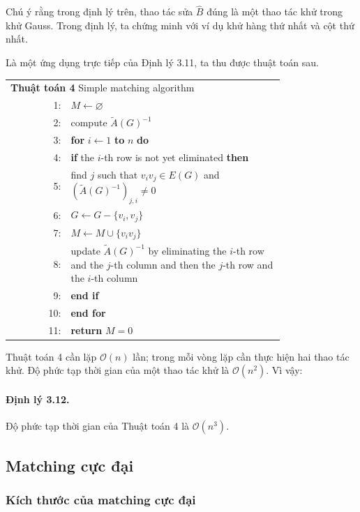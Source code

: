 \documentclass[11pt]{article}
\newcommand{\Oh}{\mathcal{O}}
\begin{document}
Chú ý rằng trong định lý trên, thao tác sửa \(\hat B\) đúng là một thao tác
khử trong khử Gauss. Trong định lý, ta chứng minh với ví dụ khử hàng thứ nhất
và cột thứ nhất.

Là một ứng dụng trực tiếp của Định lý 3.11, ta thu được thuật toán sau.

\begin{center}
\small
\begin{tabular}{r@{\quad}p{0.78\linewidth}}
\multicolumn{2}{l}{\textbf{Thuật toán 4} Simple matching algorithm}\\
1: & \(M\gets\varnothing\)\\
2: & compute \(\tilde A(G)^{-1}\)\\
3: & \textbf{for} \(i\gets 1\) \textbf{to} \(n\) \textbf{do}\\
4: & \quad \textbf{if} the \(i\)-th row is not yet eliminated \textbf{then}\\
5: & \qquad find \(j\) such that \(v_iv_j\in E(G)\) and
      \((\tilde A(G)^{-1})_{j,i}\ne 0\)\\
6: & \qquad \(G\gets G-\{v_i,v_j\}\)\\
7: & \qquad \(M\gets M\cup\{v_iv_j\}\)\\
8: & \qquad update \(\tilde A(G)^{-1}\) by eliminating the \(i\)-th row
      and the \(j\)-th column and then the \(j\)-th row and the \(i\)-th column\\
9: & \quad \textbf{end if}\\
10: & \textbf{end for}\\
11: & \textbf{return} \(M=0\)
\end{tabular}
\end{center}

Thuật toán 4 cần lặp \(\Oh(n)\) lần; trong mỗi vòng lặp cần thực hiện hai thao
tác khử. Độ phức tạp thời gian của một thao tác khử là \(\Oh(n^2)\). Vì vậy:

\paragraph{Định lý 3.12.}
Độ phức tạp thời gian của Thuật toán 4 là \(\Oh(n^3)\).

\subsection{Matching cực đại}

\subsubsection{Kích thước của matching cực đại}
\end{document}

